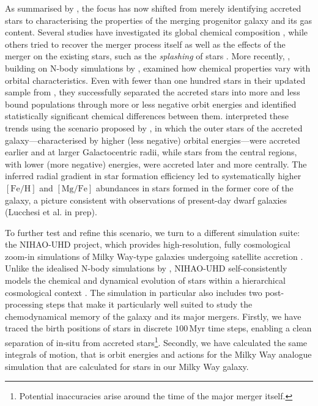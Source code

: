 \documentclass[fleqn,usenatbib]{mnras}
\begin{document}
As summarised by \citet{Helmi2020}, the focus has now shifted from merely identifying accreted stars to characterising the properties of the merging progenitor galaxy and its gas content. Several studies have investigated its global chemical composition \citep[for example][]{Das2020, Feuillet2021, Aguado2021, Matsuno2021, Buder2022, Belokurov2022, DeSilva2023, Monty2024, Ou2024}, while others tried to recover the merger process itself \citep[for example][]{Naidu2021} as well as the effects of the merger on the existing stars, such as the \textit{splashing} of stars \citep{Belokurov2020, Belokurov2022}. More recently, \citet{Skuladottir2025}, building on N-body simulations by \citet{Mori2024}, examined how chemical properties vary with orbital characteristics. Even with fewer than one hundred stars in their updated sample from \citet{Nissen2010, Nissen2024}, they successfully separated the accreted stars into more and less bound populations through more or less negative orbit energies and identified statistically significant chemical differences between them. \citet{Skuladottir2025} interpreted these trends using the scenario proposed by \citet{Mori2024}, in which the outer stars of the accreted galaxy—characterised by higher (less negative) orbital energies—were accreted earlier and at larger Galactocentric radii, while stars from the central regions, with lower (more negative) energies, were accreted later and more centrally. The inferred radial gradient in star formation efficiency led to systematically higher $\mathrm{[Fe/H]}$ and $\mathrm{[Mg/Fe]}$ abundances in stars formed in the former core of the galaxy, a picture consistent with observations of present-day dwarf galaxies (Lucchesi et al. in prep).

To further test and refine this scenario, we turn to a different simulation suite: the NIHAO-UHD project, which provides high-resolution, fully cosmological zoom-in simulations of Milky Way-type galaxies undergoing satellite accretion \citep{Buck2020, Buck2020b, Buck2021}. Unlike the idealised N-body simulations by \citet{Mori2024}, NIHAO-UHD self-consistently models the chemical and dynamical evolution of stars within a hierarchical cosmological context \citep{Buck2021}. 
The simulation in particular also includes two post-processing steps that make it particularly well suited to study the chemodynamical memory of the galaxy and its major mergers. Firstly, we have traced the birth positions of stars in discrete $100\,\mathrm{Myr}$ time steps, enabling a clean separation of in-situ from accreted stars\footnote{Potential inaccuracies arise around the time of the major merger itself.}. Secondly, we have calculated the same integrals of motion, that is orbit energies and actions for the Milky Way analogue simulation that are calculated for stars in our Milky Way galaxy.
\end{document}
